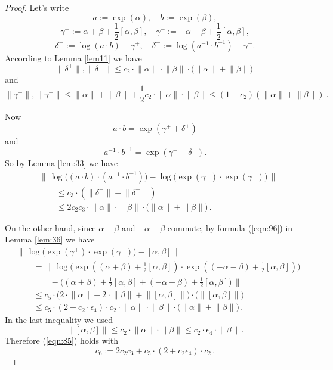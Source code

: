 \documentclass[10pt, a4paper]{amsart}
\theoremstyle{definition}
\numberwithin{equation}{section}
\newcommand{\opn}{\operatorname}
\newcommand{\smfrac}[2]{{\textstyle \frac{#1}{#2}}}
\newcommand{\norm}[1]{\lVert #1 \rVert}
\newcommand{\Norm}[1]{\bigl\lVert\, #1 \, \bigr\rVert}
\begin{document}
\begin{proof}
Let's write
\[ a := \opn{exp}(\alpha), \quad b := \opn{exp}(\beta) , \]
\[ \gamma^+ := \alpha + \beta + \smfrac{1}{2} [\alpha, \beta], \quad
\gamma^- := -\alpha - \beta + \smfrac{1}{2} [\alpha, \beta], \]
\[ \delta^+ := \log(a \cdot b) - \gamma^+, \quad
\delta^- := \log(a^{-1} \cdot b^{-1})  - \gamma^- .  \]
According to Lemma \ref{lem11} we have
\[ \norm{\delta^+}, \norm{\delta^-} \leq 
c_{2} \cdot \norm{\alpha} \cdot \norm{\beta} \cdot 
\bigl( \norm{\alpha} + \norm{\beta} \bigr) \,  \]
and
\[ \norm{\gamma^+}, \norm{\gamma^-} \leq 
\norm{\alpha} + \norm{\beta} +
\smfrac{1}{2} c_{2} \cdot \norm{\alpha} \cdot \norm{\beta}
\leq (1 + c_2)(\norm{\alpha} + \norm{\beta}) \ . \]


Now
\[ a \cdot b = \exp (\gamma^+ + \delta^+) \]
and
\[ a^{-1} \cdot b^{-1} = \exp (\gamma^- + \delta^-) . \]
So by Lemma \ref{lem:33} we have
\[ \begin{aligned}
& \Norm{ \opn{log} \bigl( (a \cdot b) \cdot (a^{-1} \cdot b^{-1}) \bigr)
- \opn{log} \bigl( \exp (\gamma^+) \cdot \exp (\gamma^-) \bigr) } \\
& \qquad \leq c_{3} \cdot (\norm{\delta^+} + \norm{\delta^-} ) \\
& \qquad \leq 2 c_2 c_3 
\cdot \norm{\alpha} \cdot \norm{\beta}
\cdot \bigl( \norm{\alpha} + \norm{\beta} \bigr) \, .
\end{aligned}  \]

On the other hand, since $\alpha + \beta$ and $-\alpha - \beta$ commute,
by formula (\ref{eqn:96}) in Lemma \ref{lem:36} we have 
\[ \begin{aligned}
& \Norm{ \opn{log} \bigl( \exp (\gamma^+) \cdot \exp (\gamma^-) \bigr) -
[\alpha, \beta] } \\
& \qquad = 
\Norm{ \opn{log} 
\bigl( \exp((\alpha + \beta) + \smfrac{1}{2} [\alpha, \beta]) \cdot 
\exp((-\alpha - \beta) + \smfrac{1}{2} [\alpha, \beta]) \bigr) \\
& \qquad \qquad - \bigl( (\alpha + \beta) + \smfrac{1}{2} [\alpha, \beta] +
(-\alpha - \beta) + \smfrac{1}{2} [\alpha, \beta] \bigr) } \\
& \qquad \leq c_5 \cdot \bigl( 2 \cdot \norm{\alpha} + 
2 \cdot \norm{\beta} + \norm{ [\alpha, \beta] } \bigr) \cdot 
\bigl( \norm{ [\alpha, \beta] } \bigr) \\
& \qquad \leq c_5 \cdot (2 + c_2 \cdot \epsilon_4) \cdot c_2 
\cdot \norm{\alpha} \cdot \norm{\beta}
\cdot \bigl( \norm{\alpha} + \norm{\beta} \bigr) \, . 
\end{aligned} \]
In the last inequality we used
\[  \norm{ [\alpha, \beta] } \leq c_2 \cdot \norm{\alpha} \cdot \norm{\beta} 
\leq c_2 \cdot \epsilon_4 \cdot \norm{\beta} \, . \]
Therefore (\ref{eqn:85}) holds with 
\[ c_6 := 2 c_2 c_3 + c_5 \cdot (2 + c_2 \epsilon_4) \cdot c_2 \, . \]
\end{proof}
\end{document}
